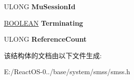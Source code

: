 \begin{DoxyCompactItemize}
\item 
\mbox{\label{struct___s_m_p___s_u_b_s_y_s_t_e_m_a2f7b05f0584e35aba666ab14db3831de}} 
U\+L\+O\+NG {\bfseries Mu\+Session\+Id}
\item 
\mbox{\label{struct___s_m_p___s_u_b_s_y_s_t_e_m_a87e922803c7dab8c06d73041e3726b90}} 
\hyperlink{_processor_bind_8h_a112e3146cb38b6ee95e64d85842e380a}{B\+O\+O\+L\+E\+AN} {\bfseries Terminating}
\item 
\mbox{\label{struct___s_m_p___s_u_b_s_y_s_t_e_m_ac26f0501b89e901505a6f1a2cc763c8b}} 
U\+L\+O\+NG {\bfseries Reference\+Count}
\end{DoxyCompactItemize}


该结构体的文档由以下文件生成\+:\begin{DoxyCompactItemize}
\item 
E\+:/\+React\+O\+S-\/0../base/system/smss/smss.\+h\end{DoxyCompactItemize}
